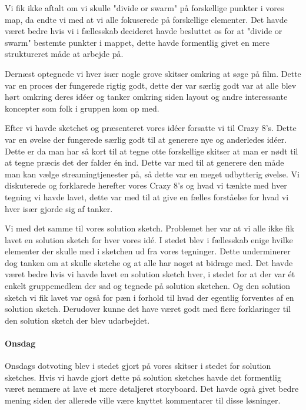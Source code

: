 \documentclass{article}
\begin{document}
Vi fik ikke aftalt om vi skulle "divide or swarm" på forskellige punkter i vores
map, da endte vi med at vi alle fokuserede på forskellige elementer. Det havde
været bedre hvis vi i fællesskab decideret havde besluttet os for at "divide or
swarm" bestemte punkter i mappet, dette havde formentlig givet en mere
struktureret måde at arbejde på.

Dernæst optegnede vi hver især nogle grove skitser omkring at søge på film.
Dette var en proces der fungerede rigtig godt, dette der var særlig godt var at
alle blev hørt omkring deres idéer og tanker omkring siden layout og andre
interessante koncepter som folk i gruppen kom op med.

Efter vi havde sketchet og præsenteret vores idéer forsatte vi til Crazy 8's.
Dette var en øvelse der fungerede særlig godt til at generere nye og anderledes
idéer. Dette er da man har så kort til at tegne otte forskellige skitser at man
er nødt til at tegne præcis det der falder én ind. Dette var med til at generere
den måde man kan vælge streamingtjenester på, så dette var en meget udbytterig
øvelse. Vi diskuterede og forklarede herefter vores Crazy 8's og hvad vi tænkte
med hver tegning vi havde lavet, dette var med til at give en fælles forståelse
for hvad vi hver især gjorde sig af tanker. %

Vi med det samme til vores solution sketch. Problemet her var at vi alle ikke
fik lavet en solution sketch for hver vores idé. I stedet blev i fællesskab
enige hvilke elementer der skulle med i sketchen ud fra vores tegninger. Dette
underminerer dog tanken om at skulle sketche og at alle har noget at bidrage
med. Det havde været bedre hvis vi havde lavet en solution sketch hver, i stedet
for at der var ét enkelt gruppemedlem der sad og tegnede på solution sketchen.
Og den solution sketch vi fik lavet var også for pæn i forhold til hvad der
egentlig forventes af en solution sketch. Derudover kunne det have været godt
med flere forklaringer til den solution sketch der blev udarbejdet.

\paragraph{Onsdag}

Onsdags dotvoting blev i stedet gjort på vores skitser i stedet for solution
sketches. Hvis vi havde gjort dette på solution sketches havde det formentlig
været nemmere at lave et mere detaljeret storyboard. Det havde også givet bedre
mening siden der allerede ville være knyttet kommentarer til disse løsninger.
\end{document}
